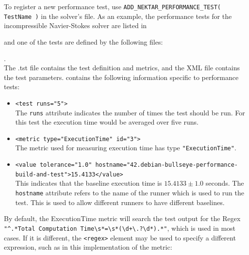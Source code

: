 To register a new performance test, use \lstinline{ADD_NEKTAR_PERFORMANCE_TEST( TestName )} in the solver's  file. As an example, the performance tests for the incompressible Navier-Stokes solver are listed in


and one of the tests are defined by the following files:


.\\

The .tst file contains the test definition and metrics, and the XML file contains the test parameters.  contains the following information specific to performance tests:
\begin{itemize}
    \item \lstinline{<test runs="5">} \\
    The \lstinline{runs} attribute indicates the number of times the test should be run. For this test the execution time would be averaged over five runs.\\

    \item \lstinline{<metric type="ExecutionTime" id="3">} \\
    The metric used for measuring execution time has type \lstinline{"ExecutionTime"}.\\

    \item \lstinline{<value tolerance="1.0" hostname="42.debian-bullseye-performance-build-and-test">15.4133</value>} \\
    This indicates that the baseline execution time is $15.4133 \pm 1.0$ seconds. The \lstinline{hostname} attribute refers to the name of the runner which is used to run the test. This is used to allow different runners to have different baselines.\\
\end{itemize}

By default, the ExecutionTime metric will search the test output for the Regex \lstinline{"^.*Total Computation Time\s*=\s*(\d+\.?\d*).*"}, which is used in most cases. If it is different, the \lstinline{<regex>} element may be used to specify a different expression, such as in this implementation of the metric:

